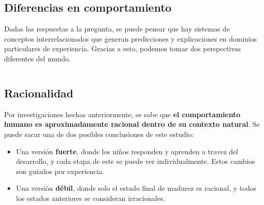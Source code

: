 \documentclass{beamer}
\begin{document}
\subsection{Diferencias en comportamiento}

\begin{frame}[fragile]
Dadas las respuestas a la pregunta, se puede pensar que hay sistemas de conceptos interrelacionados que generan predicciones y explicaciones en dominios particulares de experiencia\cite{murphy93}. Gracias a esto, podemos tomar dos perspectivas diferentes del mundo.

\vspace{2em}

\begin{columns}[T]
\begin{column}{.4\textwidth}
\end{column}

\begin{column}{.5\textwidth}
\end{column}
\end{columns}

\end{frame}

\subsection{Racionalidad}

\begin{frame}[fragile]
Por investigaciones hechas anteriormente, se sabe que \textbf{el comportamiento humano es aproximadamente racional dentro de su contexto natural}\cite{anderson90}. Se puede sacar una de dos posibles conclusiones de este estudio:

\begin{itemize}
\item Una versión \textbf{fuerte}, donde los niños responden y aprenden a travez del desarrollo, y cada etapa de este se puede ver individualmente. Estos cambios son guiados por experiencia.
\item Una versión \textbf{débil}, donde solo el estado final de madurez es racional, y todos los estados anteriores se consideran irracionales.
\end{itemize}

\end{frame}
\end{document}
